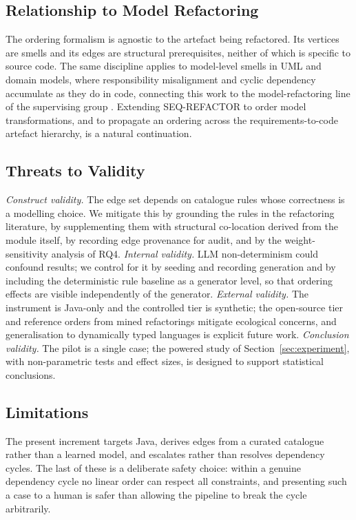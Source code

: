 \documentclass[journal,onecolumn,11pt]{IEEEtran}
\begin{document}
\subsection{Relationship to Model Refactoring}
The ordering formalism is agnostic to the artefact being refactored. Its vertices are smells and its edges are structural prerequisites, neither of which is specific to source code. The same discipline applies to model-level smells in UML and domain models, where responsibility misalignment and cyclic dependency accumulate as they do in code, connecting this work to the model-refactoring line of the supervising group \cite{stolc2010,polasek2012ines,polasek2012sisy}. Extending SEQ-REFACTOR to order model transformations, and to propagate an ordering across the requirements-to-code artefact hierarchy, is a natural continuation.

\subsection{Threats to Validity}
\emph{Construct validity.} The edge set depends on catalogue rules whose correctness is a modelling choice. We mitigate this by grounding the rules in the refactoring literature, by supplementing them with structural co-location derived from the module itself, by recording edge provenance for audit, and by the weight-sensitivity analysis of RQ4. \emph{Internal validity.} LLM non-determinism could confound results; we control for it by seeding and recording generation and by including the deterministic rule baseline as a generator level, so that ordering effects are visible independently of the generator. \emph{External validity.} The instrument is Java-only and the controlled tier is synthetic; the open-source tier and reference orders from mined refactorings mitigate ecological concerns, and generalisation to dynamically typed languages is explicit future work. \emph{Conclusion validity.} The pilot is a single case; the powered study of Section~\ref{sec:experiment}, with non-parametric tests and effect sizes, is designed to support statistical conclusions.

\subsection{Limitations}
The present increment targets Java, derives edges from a curated catalogue rather than a learned model, and escalates rather than resolves dependency cycles. The last of these is a deliberate safety choice: within a genuine dependency cycle no linear order can respect all constraints, and presenting such a case to a human is safer than allowing the pipeline to break the cycle arbitrarily.
\end{document}
